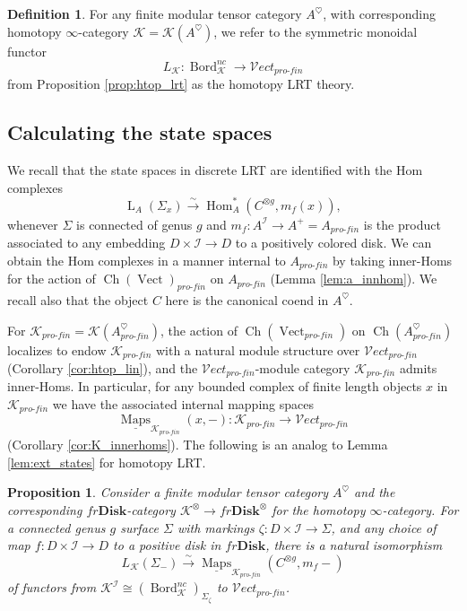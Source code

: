 \documentclass[reqno]{amsart}
\newtheorem{proposition}[lemma]{Proposition}
\theoremstyle{definition}
\newtheorem{definition}[lemma]{Definition}
\newcommand{\mcl}[1]{\mathcal{#1}}
\newcommand{\msc}[1]{\mathscr{#1}}
\newcommand{\opn}[1]{\operatorname{#1}}
\newcommand{\ot}{\otimes}
\newcommand{\Vect}{\msc{V}\!ect}
\newcommand{\Disk}{\mathbf{Disk}}
\newcommand{\pf}{pro\text{-}fin}
\DeclareMathOperator{\Hom}{Hom}
\DeclareMathOperator{\Maps}{Maps}
\DeclareMathOperator{\Bord}{Bord}
\renewcommand{\1}{\mathbf{1}}
\begin{document}
\begin{definition}
For any finite modular tensor category $A^{\heartsuit}$, with corresponding homotopy $\infty$-category $\msc{K}=\msc{K}(A^{\heartsuit})$, we refer to the symmetric monoidal functor
\[
L_{\msc{K}}:\Bord^{nc}_{\msc{K}}\to \Vect_{\pf}
\]
from Proposition \ref{prop:htop_lrt} as the homotopy LRT theory.
\end{definition}


\subsection{Calculating the state spaces}

We recall that the state spaces in discrete LRT are identified with the Hom complexes
\[
\opn{L}_A(\Sigma_x)\overset{\sim}\to\Hom_{A}^{\ast}(C^{\ot g},m_f(x)),
\]
whenever $\Sigma$ is connected of genus $g$ and $m_f:A^{\mcl{I}}\to A^+=A_{\pf}$ is the product associated to any embedding $D\times \mcl{I}\to D$ to a positively colored disk.  We can obtain the Hom complexes in a manner internal to $A_{\pf}$ by taking inner-Homs for the action of $\opn{Ch}(\opn{Vect})_{\pf}$ on $A_{\pf}$ (Lemma \ref{lem:a_innhom}).  We recall also that the object $C$ here is the canonical coend in $A^{\heartsuit}$.
\par

For $\msc{K}_{\pf}=\msc{K}(A^{\heartsuit}_{\pf})$, the action of $\opn{Ch}(\opn{Vect}_{\pf})$ on $\opn{Ch}(A^{\heartsuit}_{\pf})$ localizes to endow $\msc{K}_{\pf}$ with a natural module structure over $\Vect_{\pf}$ (Corollary \ref{cor:htop_lin}), and the $\Vect_{\pf}$-module category $\msc{K}_{\pf}$ admits inner-Homs.  In particular, for any bounded complex of finite length objects $x$ in $\msc{K}_{\pf}$ we have the associated internal mapping spaces
\begin{equation}
\underline{\Maps}_{\msc{K}_{\pf}}(x,-):\msc{K}_{\pf}\to \Vect_{\pf}
\end{equation}
(Corollary \ref{cor:K_innerhoms}). The following is an analog to Lemma \ref{lem:ext_states} for homotopy LRT.

\begin{proposition}\label{prop:htop_states}
Consider a finite modular tensor category $A^{\heartsuit}$ and the corresponding $fr\Disk$-category $\msc{K}^{\ot}\to fr\Disk^{\ot}$ for the homotopy $\infty$-category. For a connected genus $g$ surface $\Sigma$ with markings $\zeta:D\times\mcl{I}\to \Sigma$, and any choice of map $f:D\times \mcl{I}\to D$ to a positive disk in $fr\Disk$, there is a natural isomorphism
\[
L_{\msc{K}}(\Sigma_-)\overset{\sim}\to \underline{\Maps}_{\msc{K}_{\pf}}(C^{\ot g},m_f-)
\]
of functors from $\msc{K}^{\mcl{I}}\cong(\Bord_{\msc{K}}^{nc})_{\Sigma_{\zeta}}$ to $\Vect_{\pf}$.
\end{proposition}
\end{document}
